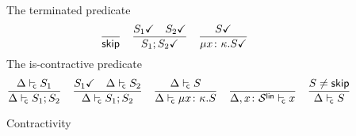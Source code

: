 \begin{figure}[tp]
  The terminated predicate \hfill{}
  \begin{equation*}
    \frac{}{\mathsf{skip}}
    \quad
    \frac{
      {S_1}\checkmark
      \quad
      {S_2}\checkmark
    }{
      {S_1;S_2}\checkmark
    }
    \quad
    \frac{
      {S}\checkmark
    }{
      {\mu{x\colon\kappa}.{S}}\checkmark
}
  \end{equation*}
  The is-contractive predicate \hfill{}
  \begin{equation*}
    \frac{
      \isContr{S_1}
    }{
      \isContr{S_1;S_2}
    }
    \quad
    \frac{
      \isDone{S_1}
      \quad
      \isContr{S_2}
    }{
      \isContr{S_1;S_2}
    }
    \quad
    \frac{
      \isContr S
    }{
      \isContr{\rect{x\colon\kind}S}
    }
    \quad
    \frac{}{
      \isContr[\Delta,x\colon\kindk\kinds\link] x
    }
    \quad
    \frac{
      S\neq\skipt
    }{
      \isContr S
    }
  \end{equation*}
  \caption{Contractivity}
  \label{fig:contractivity}
\end{figure}



